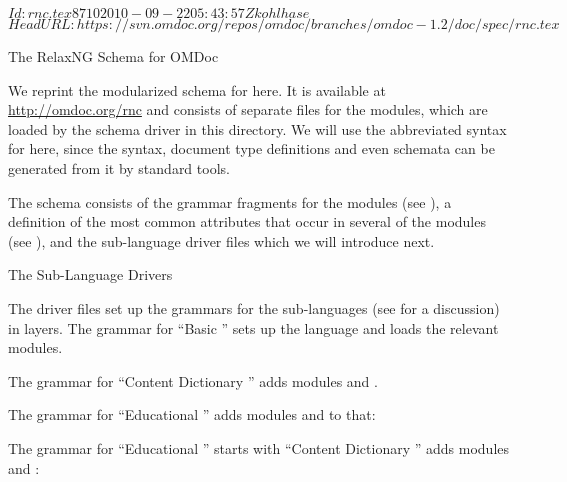 \svnInfo $Id: rnc.tex 8710 2010-09-22 05:43:57Z kohlhase $
\svnKeyword $HeadURL: https://svn.omdoc.org/repos/omdoc/branches/omdoc-1.2/doc/spec/rnc.tex $

\begin{tchapter}[id=rnc]{The RelaxNG Schema for OMDoc}

We reprint the modularized {\relaxng} schema for {\omdoc} here. It is available at
\url{http://omdoc.org/rnc} and consists of separate files for the {\omdoc}
modules, which are loaded by the schema driver {} in this directory. We
will use the abbreviated syntax for {\relaxng} here, since the {\xml} syntax, document
type definitions and even {\xml} schemata can be generated
from it by standard tools.

The {\relaxng} schema consists of the grammar fragments for the modules (see
{}), a definition of the most common attributes that
occur in several of the modules (see {}), and the sub-language
driver files which we will introduce next.

\begin{tsection}[id=rnc:drivers]{The Sub-Language Drivers}

  The driver files set up the grammars for the {\omdoc} sub-languages (see
  {} for a discussion) in layers. The {\relaxng} grammar for ``Basic
  {\omdoc}'' sets up the language and loads the relevant modules.

  
  
  The {\relaxng} grammar for ``Content Dictionary {\omdoc}'' adds modules
  {} and {}.
  

  The {\relaxng} grammar for ``Educational {\omdoc}'' adds modules
  {} and {} to that:
  

  The {\relaxng} grammar for ``Educational {\omdoc}'' starts with ``Content Dictionary
  {\omdoc}'' adds modules {} and {}:
  


\end{tsection}
\end{tchapter}
